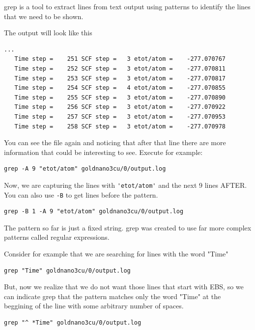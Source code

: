 grep is a tool to extract lines from text output using patterns to identify the lines that we need to be shown.

The output will look like this

\begin{lstlisting}
...
   Time step =    251 SCF step =   3 etot/atom =    -277.070767
   Time step =    252 SCF step =   3 etot/atom =    -277.070811
   Time step =    253 SCF step =   3 etot/atom =    -277.070817
   Time step =    254 SCF step =   4 etot/atom =    -277.070855
   Time step =    255 SCF step =   3 etot/atom =    -277.070890
   Time step =    256 SCF step =   3 etot/atom =    -277.070922
   Time step =    257 SCF step =   3 etot/atom =    -277.070953
   Time step =    258 SCF step =   3 etot/atom =    -277.070978
\end{lstlisting}

You can see the file again and noticing that after that line there are more information that could be interesting to see.
Execute for example:

\begin{lstlisting}
grep -A 9 "etot/atom" goldnano3cu/0/output.log
\end{lstlisting}

Now, we are capturing the lines with \verb|'etot/atom'| and the next 9 lines AFTER. You can also use \texttt{-B} to get lines before the pattern.

\begin{lstlisting}
grep -B 1 -A 9 "etot/atom" goldnano3cu/0/output.log
\end{lstlisting}

The pattern so far is just a fixed string. grep was created to use far more complex patterns called regular expressions.

Consider for example that we are searching for lines with the word "Time"

\begin{lstlisting}
grep "Time" goldnano3cu/0/output.log
\end{lstlisting}

But, now we realize that we do not want those lines that start with EBS, so we can indicate grep that the pattern matches only the word "Time" at the beggining of the line with some arbitrary number of spaces.

\begin{lstlisting}
grep "^ *Time" goldnano3cu/0/output.log
\end{lstlisting}

